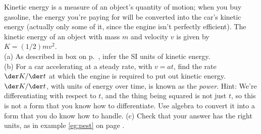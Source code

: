 Kinetic energy is a measure of an object's quantity of motion; when you buy gasoline,  the
energy you're paying for will be converted into the car's kinetic energy (actually only some of
it, since the engine isn't perfectly efficient). The kinetic energy of an object with mass
$m$ and velocity $v$ is given by $K=(1/2)mv^2$.\\
(a) As described in box  on p.~\pageref{fig:units}, infer the SI units of kinetic energy.\\
(b) For a car accelerating at a steady rate, with
$v=at$, find the rate $\der K/\der t$ at which the engine is required to put out kinetic energy.
$\der K/\der t$, with units of energy over time, is known as the \emph{power}.
Hint: We're differentiating with respect to $t$, and the thing being squared is not
just $t$, so this is not a form that you know how to differentiate. Use algebra
to convert it into a form that you do know how to handle.\answercheck\hwendpart
(c) Check that your answer has the right units, as in example \ref{eg:pest} on page \pageref{eg:pest}.

